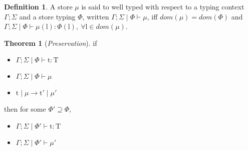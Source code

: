 \documentclass[10pt]{article}
\newcommand{\lto}{\longrightarrow}
\newcommand{\context}{\Gamma;\Sigma\mid\Phi}
\theoremstyle{definition}\newtheorem*{theorem}{Theorem}
\theoremstyle{definition}\newtheorem*{definition}{Definition}
\begin{document}
    \newpage
    \begin{definition}
        A store $\mu$ is said to well typed with respect to a typing context $\Gamma;\Sigma$ and a store typing $\Phi$,
        written $\context\vdash\mu$, iff $dom(\mu) = dom(\Phi)$ and $\context\vdash \mu(\mathrm{l})\colon\Phi(\mathrm{l}),\ \forall \mathrm{l} \in dom(\mu)$.
    \end{definition}
    \begin{theorem}[{\it Preservation}]
        if 
        \begin{itemize}
            \item[] $\context\vdash\mathrm{t}\colon\mathrm{T}$
            \item[] $\context\vdash\mu$
            \item[] $\mathrm{t}\mid\mu\lto\mathrm{t'}\mid\mu'$
        \end{itemize}
        then for some $\Phi'\supseteq\Phi$,
        \begin{itemize}
            \item[] $\Gamma;\Sigma\mid\Phi'\vdash\mathrm{t}\colon\mathrm{T}$
            \item[] $\Gamma;\Sigma\mid\Phi'\vdash\mu'$
        \end{itemize}
    \end{theorem}
\end{document}
